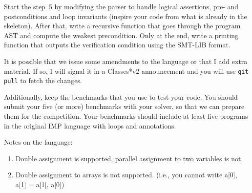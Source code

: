 \documentclass[11pt]{article}
\begin{document}
Start the step~5 by modifying the parser to handle logical assertions,
pre- and postconditions and loop invariants (inspire your code from what
is already in the skeleton).  After that, write a recursive function that
goes through the program AST and compute the weakest precondition.  Only
at the end, write a printing function that outputs the verification condition
using the SMT-LIB format.

It is possible that we issue some amendments to the language or that I
add extra material.  If so, I will signal it in a Classes*v2 announcement
and you will use \texttt{git pull} to fetch the changes.

Additionally, keep the benchmarks that you use to test your code. 
You should submit your five (or more) benchmarks with your solver,
so that we can prepare them for the competition.  Your benchmarks
should include at least five programs in the original IMP language with loops and annotations.



Notes on the language: 
\begin{enumerate}
\item Double assignment is supported, parallel assignment to two variables is not.
\item Double assignment to arrays is not supported. (i.e., you cannot write a[0], a[1] = a[1], a[0])
\end{enumerate}

\end{document}
